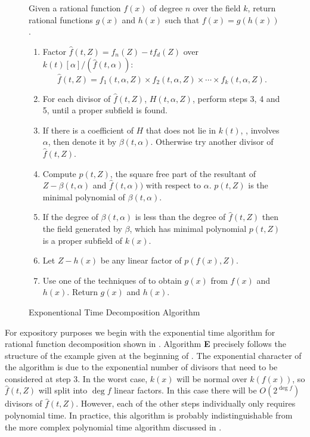 \begin{figure}
\small
{} Given a rational function $f(x)$ of degree $n$
over the field $k$, return rational functions $g(x)$ and $h(x)$ such
that $f(x) = g(h(x))$.
\begin{enumerate}

\item Factor $\hat{f}(t, Z) = f_n(Z) - t f_d(Z)$ over
$k(t)[\alpha]/(\hat{f}(t, \alpha))$: 
\[
\hat{f}(t,Z) = f_1(t, \alpha, Z)\times f_2(t, \alpha, Z) \times
\cdots \times f_k(t, \alpha, Z).
\]

\item For each divisor of $\hat{f}(t, Z)$, $H(t, \alpha, Z)$, perform
steps 3, 4 and 5, until a proper subfield is found.

\item If there is a coefficient of $H$ that does not lie in $k(t)$,
\ie, involves $\alpha$, then denote it by $\beta(t, \alpha)$.
Otherwise try another divisor of $\hat{f}(t, Z)$. 

\item Compute $p(t, Z)$, the square free part of the resultant of $Z -
\beta(t, \alpha)$ and $\hat{f}(t, \alpha))$ with respect to $\alpha$.
$p(t, Z)$ is the minimal polynomial of $\beta(t, \alpha)$.

\item If the degree of $\beta(t, \alpha)$ is less than the degree of
$\hat{f}(t, Z)$ then the field generated by $\beta$, which has minimal
polynomial $p(t, Z)$ is a proper subfield of $k(x)$.

\item Let $Z - h(x)$ be any linear factor of $p(f(x), Z)$.

\item Use one of the techniques of  to obtain
$g(x)$ from $f(x)$ and $h(x)$.  Return $g(x)$ and $h(x)$. 

\end{enumerate}
\caption{Exponentional Time Decomposition Algorithm\label{Alg:E:Fig}}
\end{figure}

For expository purposes we begin with the exponential time algorithm for
rational function decomposition shown in .
Algorithm {\bf E} precisely follows the structure of the example given
at the beginning of .  The exponential character of
the algorithm is due to the exponential number of divisors that need
to be considered at step 3.  In the worst case, $k(x)$ will be normal
over $k(f(x))$, so $\hat{f}(t, Z)$ will split into $\deg f$ linear
factors.  In this case there will be $O(2^{\deg f})$ divisors of
$\hat{f}(t, Z)$.  However, each of the other steps individually only
requires polynomial time.  In practice, this algorithm is probably
indistinguishable from the more complex polynomial time algorithm
discussed in .

